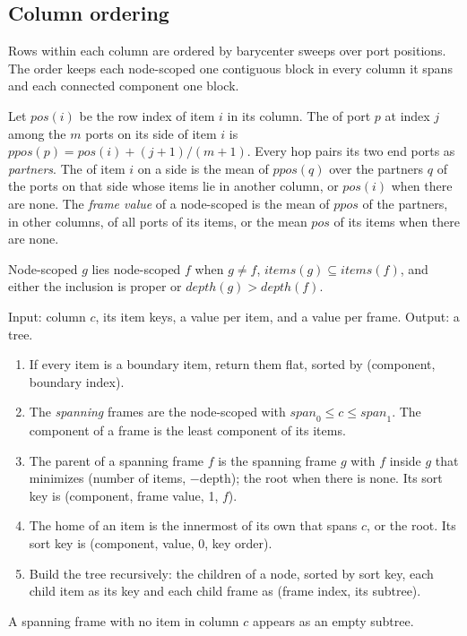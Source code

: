 \subsection{Column ordering}\label{sec:pictorial-order}

Rows within each column are ordered by barycenter sweeps over port positions. The order keeps
each node-scoped \bbox{} one contiguous block in every column it spans and each connected
component one block.

\begin{definition}\label{def:pictorial-bary}
Let $\mathit{pos}(i)$ be the row index of item $i$ in its column. The  of port $p$
at index $j$ among the $m$ ports on its side of item $i$ is
$\mathit{ppos}(p) = \mathit{pos}(i) + (j+1)/(m+1)$. Every hop pairs its two end ports as
\emph{partners}. The  of item $i$ on a side is the mean of $\mathit{ppos}(q)$
over the partners $q$ of the ports on that side whose items lie in another column, or
$\mathit{pos}(i)$ when there are none. The \emph{frame value} of a node-scoped \bbox{} is the
mean of $\mathit{ppos}$ of the partners, in other columns, of all ports of its items, or the
mean $\mathit{pos}$ of its items when there are none.
\end{definition}

\begin{definition}[Inside]\label{def:pictorial-inside}
Node-scoped \bbox{} $g$ lies  node-scoped \bbox{} $f$ when $g\neq f$,
$\mathit{items}(g)\subseteq\mathit{items}(f)$, and either the inclusion is proper or
$\mathit{depth}(g) > \mathit{depth}(f)$.
\end{definition}

\begin{algorithm}\label{alg:pictorial-arrange}
Input: column $c$, its item keys, a value per item, and a value per frame. Output: a tree.
\begin{enumerate}
  \item If every item is a boundary item, return them flat, sorted by (component, boundary
    index).
  \item The \emph{spanning} frames are the node-scoped \bboxes{} with
    $\mathit{span}_0\le c\le \mathit{span}_1$. The component of a frame is the least component of
    its items.
  \item The parent of a spanning frame $f$ is the spanning frame $g$ with $f$ inside $g$ that
    minimizes (number of items, $-$depth); the root when there is none. Its sort key is
    (component, frame value, 1, $f$).
  \item The home of an item is the innermost of its own \bboxes{} that spans $c$, or the root.
    Its sort key is (component, value, 0, key order).
  \item Build the tree recursively: the children of a node, sorted by sort key, each child item
    as its key and each child frame as (frame index, its subtree).
\end{enumerate}
A spanning frame with no item in column $c$ appears as an empty subtree.
\end{algorithm}

